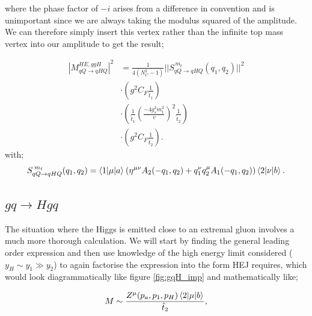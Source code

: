where the phase factor of $-i$ arises from a difference in convention and is unimportant since we are always taking the modulus squared of the amplitude. We can therefore simply insert this vertex rather than the infinite top mass vertex into our amplitude to get the result;

\begin{equation}
\begin{split}
|M_{qQ \to qHQ}^{HE,ggH}|^2 &= \frac{1}{4(N_C^2 - 1)} ||S_{qQ \to qHQ}^{\hspace{2pt} m_t}(q_1, q_2)||^2 \\
& \cdot \left(g^2 C_F \frac{1}{\hat{t}_1} \right) \\
& \cdot \left(\frac{1}{\hat{t}_1} \left(\frac{-4 g_s^2 m_t^2}{v} \right)^2 \frac{1}{\hat{t}_2} \right) \\
& \cdot \left(g^2 C_F \frac{1}{\hat{t}_2} \right).
\end{split}
\end{equation}
with;
\begin{equation}
S_{qQ \to qHQ}^{\hspace{2pt} m_t}(q_1, q_2) = \mathinner{\langle1\vert\mu\vert a\rangle}_{} (\eta^{\mu \nu}A_2(-q_1,q_2) + q_1^\nu q_2^\mu A_1(-q_1,q_2))\mathinner{\langle2\vert\nu\vert b\rangle}_{}. 
\end{equation}

\subsection{$gq \to Hgq$}

The situation where the Higgs is emitted close to an extremal gluon involves a much more thorough calculation. We will start by finding the general leading order expression and then use knowledge of the high energy limit considered ($y_H \sim y_1 \gg y_2$) to again factorise the expression into the form HEJ requires, which would look diagrammatically like figure \ref{fig:gqH_imp} and mathematically like;

\begin{equation}
M \sim \frac{Z^{\mu}(p_a,p_1,p_H) \mathinner{\langle2\vert\mu\vert b\rangle}_{}}{\hat{t}_2},
\label{eqn:higgseff}
\end{equation}

